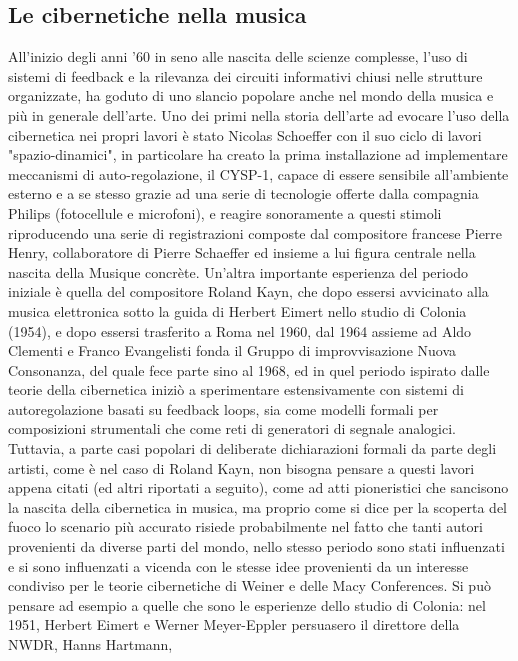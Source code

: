 \subsection{Le cibernetiche nella musica}
\label{sec:Le cibernetiche nella musica}
All'inizio degli anni '60 in seno alle nascita delle scienze complesse,
l'uso di sistemi di feedback e la rilevanza dei circuiti informativi chiusi
nelle strutture organizzate,
ha goduto di uno slancio popolare anche nel mondo della musica e più in generale dell'arte.
Uno dei primi nella storia dell'arte ad evocare l'uso della cibernetica nei propri lavori è stato
Nicolas Schoeffer con il suo ciclo di lavori "spazio-dinamici", in particolare ha creato
la prima installazione ad implementare meccanismi di auto-regolazione, il CYSP-1,
capace di essere sensibile all'ambiente esterno e a se stesso
grazie ad una serie di tecnologie offerte dalla compagnia Philips (fotocellule e microfoni),
e reagire sonoramente a questi stimoli riproducendo
una serie di registrazioni composte dal compositore francese Pierre Henry,
collaboratore di Pierre Schaeffer ed insieme a lui figura centrale nella nascita della Musique concrète.
Un'altra importante esperienza del periodo iniziale è quella del compositore Roland Kayn,
che dopo essersi avvicinato alla musica elettronica sotto la guida di Herbert Eimert
nello studio di Colonia (1954),
e dopo essersi trasferito a Roma nel 1960, dal 1964 assieme ad Aldo Clementi e Franco Evangelisti
fonda il Gruppo di improvvisazione Nuova Consonanza, del quale fece parte sino al 1968,
ed in quel periodo ispirato dalle teorie della cibernetica iniziò a sperimentare
estensivamente con sistemi di autoregolazione basati su feedback loops,
sia come modelli formali per composizioni strumentali che come reti di generatori di segnale analogici.
Tuttavia, a parte casi popolari di deliberate dichiarazioni formali da parte degli artisti,
come è nel caso di Roland Kayn,
non bisogna pensare a questi lavori appena citati (ed altri riportati a seguito),
come ad atti pioneristici che sancisono la nascita della cibernetica in musica,
ma proprio come si dice per la scoperta del fuoco
lo scenario più accurato risiede probabilmente nel fatto che
tanti autori provenienti da diverse parti del mondo, nello stesso periodo
sono stati influenzati e si sono influenzati a vicenda con le stesse idee
provenienti da un interesse condiviso per le teorie cibernetiche di Weiner e delle Macy Conferences.
Si può pensare ad esempio a quelle che sono le esperienze dello studio di Colonia:
nel 1951, Herbert Eimert e Werner Meyer-Eppler persuasero il direttore della NWDR, Hanns Hartmann,
